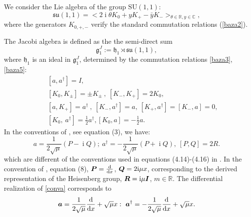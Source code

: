 \documentclass[12pt]{amsart}
\numberwithin{equation}{section}
\theoremstyle{definition}
\begin{document}
We  consider the Lie algebra of the group $\text{SU}(1,1)$:
\begin{equation}\label{nr1}
{{\mathfrak{{su}}}}(1,1)=
<2{\operatorname{i}}\theta K_0+yK_+-\bar{y}K_->_{\theta\in{\ensuremath{\mathbb{R}}} ,y\in{\ensuremath{\mathbb{C}}}} , \end{equation} 
where the generators $K_{0,+,-}$ verify the standard commutation relations
(\ref{baza2}).

The Jacobi algebra is defined as the  the semi-direct sum \cite{jac1}
\begin{equation}\label{baza}
{{\mathfrak{{g}}}}^J_1:= {{\mathfrak{{h}}}}_1\rtimes {{\mathfrak{{su}}}}(1,1),
\end{equation}
where ${{\mathfrak{{h}}}}_1$ is an  ideal in ${{\mathfrak{{g}}}}^J_1$,
determined by the commutation relations \eqref{baza3}, \eqref{baza5}:
\begin{subequations}\label{baza11}
\begin{eqnarray}
& & [a,{{a}^\dagger}]=I\label{baza1}, \\
\label{baza2}
~& & \left[ K_0, K_{\pm}\right]=\pm K_{\pm}~,~ 
\left[ K_-,K_+ \right]=2K_0 , \\
\label{baza3}
& & \left[a,K_+\right]=a^{\dagger}~,~\left[ K_-,a^{\dagger}\right]=a, ~
\left[ K_+,a^{\dagger}\right]=\left[ K_-, a\right]= 0 ,\\
\label{baza5}
& & \left[ K_0  ,~a^{\dagger}\right]=\frac{1}{2}a^{\dagger}, \left[ K_0,a\right]
=-\frac{1}{2}a .
\end{eqnarray}
\end{subequations}
In the conventions of \cite{sbcg},  see equation (3), we have:
\begin{equation}\label{conva}
a=\frac{1}{2\sqrt{\mu}}(P-{\operatorname{i}} Q);~ a^{\dagger}=-\frac{1}{2\sqrt{\mu}}(P+{\operatorname{i}} Q),  ~[P,Q]=2R.
\end{equation}
which are different of the conventions used in equations (4.14)-(4.16)
in \cite{sbcg}. 
In the convention of  \cite{sbcg}, equation (8), ${{\mbox{\boldmath{${P}$}}}}=\frac{\operatorname{d}}{{\operatorname{d}} x}$, ${{\mbox{\boldmath{${Q}$}}}}=2{\operatorname{i}} \mu x$, corresponding to the derived representation of the Heisenberg group, ${{\mbox{\boldmath{${R}$}}}}={\operatorname{i}} \mu {{\mbox{\boldmath{${I}$}}}}$,  $m\in{\ensuremath{\mathbb{R}}}$.  The differential realization of \eqref{conva} corresponds to
\begin{equation}\label{difreal}
{{\mbox{\boldmath{${a}$}}}}=\frac{1}{2\sqrt{\mu}}\frac{\operatorname{d}}{{\operatorname{d}} x} + \sqrt{\mu}x:~{{\mbox{\boldmath{${a}$}}}}^{\dagger}=-\frac{1}{2\sqrt{\mu}}\frac{\operatorname{d}}{{\operatorname{d}} x}+ \sqrt{\mu}x.
\end{equation}
\end{document}
